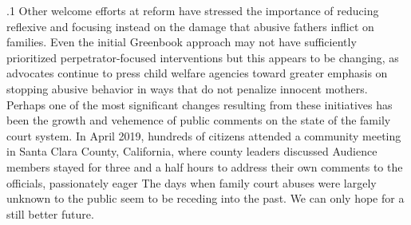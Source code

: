 \documentclass[11pt, twoside]{article}
\begin{document}
{{}%

\p.1{%
Other welcome efforts at reform have stressed the importance of
reducing reflexive  and focusing instead on the damage that abusive fathers inflict on families. Even the initial Greenbook
approach may not have sufficiently prioritized perpetrator-focused
interventions \mdash{}but this appears to be changing, as advocates continue
to press child welfare agencies toward greater emphasis on stopping
abusive behavior in ways that do not penalize innocent mothers.
Perhaps one of the most significant changes resulting from these initiatives has been the growth and vehemence of public comments on
the state of the family court system. In April 2019, hundreds of citizens attended a community meeting in Santa Clara County, California,
where county leaders discussed  Audience members stayed for
three and a half hours to address their own comments to the officials,
passionately eager  The days when family court abuses were largely unknown to the public seem to be receding into the past. We can only hope
for a still better future.
}%





}
\end{document}

